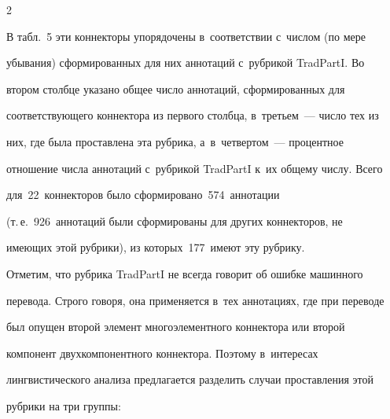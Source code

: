 \begin{multicols}{2}
  


  В табл.~5 эти коннекторы упорядочены в~соответствии с~числом (по мере 


убывания) сформированных для них аннотаций с~рубрикой TradPartI. Во 


втором столбце указано общее число аннотаций, сформированных для 


соответствующего коннектора из первого столбца, в~третьем~--- число тех из 


них, где была проставлена эта рубрика, а~в~чет\-вер\-том~--- процентное 


отношение числа аннотаций с~рубрикой TradPartI к~их общему числу. Всего 


для~22~коннекторов было сформировано~574~аннотации 


(т.\,е.~926~аннотаций были сформированы для других коннекторов, не 


имеющих этой рубрики), из которых~177~имеют эту рубрику.


  


  


  


  


 


  Отметим, что рубрика TradPartI не всегда говорит об ошибке машинного 


перевода. Строго говоря, она применяется в~тех аннотациях, где при переводе 


был опущен второй элемент многоэлементного коннектора или второй 


компонент двухкомпонентного коннектора. Поэтому в~интересах 


лингвистического анализа предлагается разделить случаи проставления этой 


рубрики на три группы:\\[-15pt]


\end{multicols}
